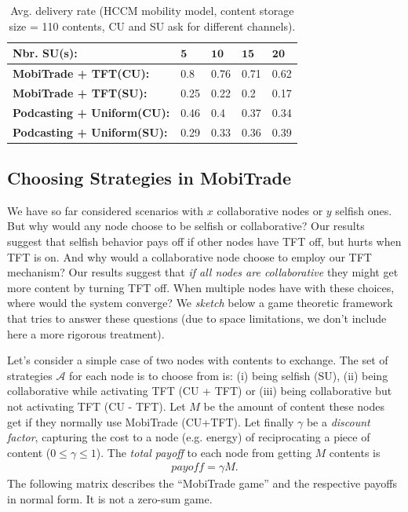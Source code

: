 \begin{table}[!h]
\vspace{-0.1in}
\caption{Avg. delivery rate (HCCM mobility model, content storage size = 110 contents, CU and SU ask for different channels).}
\centering
\label{table:hcmm:vss}
\footnotesize
\begin{tabular}{|p{5cm}|p{0.8cm}|p{0.8cm}|p{0.8cm}|p{0.8cm}|}
\hline
\bfseries Nbr. SU(s):& $\mathbf{5}$ & $\mathbf{10}$& $\mathbf{15}$ & $\mathbf{20}$\\
\hline
\bfseries MobiTrade + TFT(CU): & 0.8 & 0.76 &0.71 &0.62 \\
\hline
\bfseries MobiTrade + TFT(SU): & 0.25 & 0.22 &0.2&0.17\\
\hline
\bfseries Podcasting + Uniform(CU): &  0.46&0.4 &0.37&0.34\\
\hline
\bfseries Podcasting + Uniform(SU): & 0.29&0.33&0.36&0.39\\
\hline
\end{tabular}
\end{table}

\subsection{Choosing Strategies in MobiTrade}
\label{game}

We have so far considered scenarios with $x$ collaborative nodes or $y$ selfish ones. But why would any node choose to be selfish or collaborative? Our results suggest that selfish behavior pays off if other nodes have TFT off, but hurts when TFT is on. And why would a collaborative node choose to employ our TFT mechanism? Our results suggest that \emph{if all nodes are collaborative} they might get more content by turning TFT off. When multiple nodes have with these choices, where would the system converge? We \emph{sketch} below a game theoretic framework that tries to answer these questions (due to space limitations, we don't include here a more rigorous treatment).

Let's consider a simple case of two nodes with contents to exchange. The set of strategies $\mathcal{A}$ for each node is to choose from is: (i) being selfish (SU), (ii) being collaborative while activating TFT (CU + TFT) or (iii) being collaborative but not activating TFT (CU - TFT). Let $M$ be the amount of content these nodes get if they normally use MobiTrade (CU+TFT). Let finally $\gamma$ be a \emph{discount factor}, capturing the cost to a node (e.g. energy) of reciprocating a piece of content ($ 0 \le \gamma \le 1$).  The \emph{total payoff} to each node from getting $M$ contents is
\begin{eqnarray*}
payoff = \gamma M.
\end{eqnarray*}
The following matrix describes the ``MobiTrade game'' and the respective payoffs in normal form. It is not a zero-sum game.

